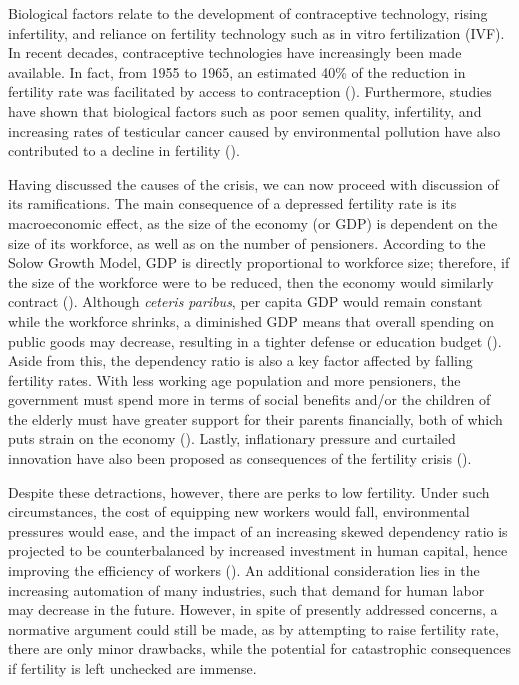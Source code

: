 \documentclass[12pt, a4paper, twoside]{article}
\begin{document}
Biological factors relate to the development of contraceptive technology, rising infertility, and reliance on fertility technology such as in vitro fertilization (IVF). In recent decades, contraceptive technologies have increasingly been made available. In fact, from 1955 to 1965, an estimated 40\% of the reduction in fertility rate was facilitated by access to contraception (\cite[p.\ 25]{bailey2010mommas}). Furthermore, studies have shown that biological factors such as poor semen quality, infertility, and increasing rates of testicular cancer caused by environmental pollution have also contributed to a decline in fertility (\cite{skakkebaek2022environmental}).  

Having discussed the causes of the crisis, we can now proceed with discussion of its ramifications. The main consequence of a depressed fertility rate is its macroeconomic effect, as the size of the economy (or GDP) is dependent on the size of its workforce, as well as on the number of pensioners. According to the Solow Growth Model, GDP is directly proportional to workforce size; therefore, if the size of the workforce were to be reduced, then the economy would similarly contract (\cite{solow1956contribution}). Although \emph{ceteris paribus}, per capita GDP would remain constant while the workforce shrinks, a diminished GDP means that overall spending on public goods may decrease, resulting in a tighter defense or education budget (\cite[p.\ 88]{kearney2023causes}). Aside from this, the dependency ratio is also a key factor affected by falling fertility rates. With less working age population and more pensioners, the government must spend more in terms of social benefits and/or the children of the elderly must have greater support for their parents financially, both of which puts strain on the economy (\cite[pp.\ 91–92]{kearney2023causes}). Lastly, inflationary pressure and curtailed innovation have also been proposed as consequences of the fertility crisis (\cites{jones2022end}[p.\ 18]{kohler2006low}).

Despite these detractions, however, there are perks to low fertility. Under such circumstances, the cost of equipping new workers would fall, environmental pressures would ease, and the impact of an increasing skewed dependency ratio is projected to be counterbalanced by increased investment in human capital, hence improving the efficiency of workers (\cites[p.\ 3]{jarzebski2021ageing}{lee2010fertility}[p.\ 7]{lee2014low}). An additional consideration lies in the increasing automation of many industries, such that demand for human labor may decrease in the future. However, in spite of presently addressed concerns, a normative argument could still be made, as by attempting to raise fertility rate, there are only minor drawbacks, while the potential for catastrophic consequences if fertility is left unchecked are immense. 
\end{document}
